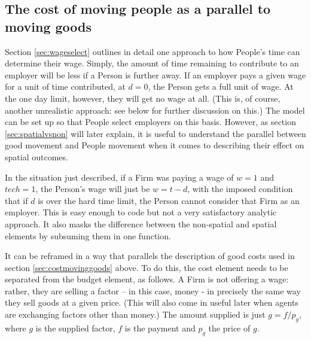 \subsection{The cost of moving people as a parallel to moving goods \label{sec:reframingpeoplecost}}

Section \ref{sec:wageselect} outlines in detail one approach to how People's time can determine their wage. Simply, the amount of time remaining to contribute to an employer will be less if a Person is further away. If an employer pays a given wage for a unit of time contributed, at $d=0$, the Person gets a full unit of wage. At the one day limit, however, they will get no wage at all. (This is, of course, another unrealistic approach: see below for further discussion on this.) The model can be set up so that People select employers on this basis. However, as section \ref{sec:spatialvsnon} will later explain, it is useful to understand the parallel between good movement and People movement when it comes to describing their effect on spatial outcomes. 

In the situation just described, if a Firm was paying a wage of $w=1$ and $tech=1$, the Person's wage will just be $w=t-d$, with the imposed condition that if $d$ is over the hard time limit, the Person cannot consider that Firm as an employer. This is easy enough to code but not a very satisfactory analytic approach. It also masks the difference between the non-spatial and spatial elements by subsuming them in one function.

It can be reframed in a way that parallels the description of good costs used in section \ref{sec:costmovinggoods} above. To do this, the cost element needs to be separated from the budget element, as follows. A Firm is not offering a wage: rather, they are selling a factor – in this case, money - in precisely the same way they sell goods at a given price. (This will also come in useful later when agents are exchanging factors other than money.) The amount supplied is just $g=f/p_g$, where $g$ is the supplied factor, $f$ is the payment and $p_g$ the price of $g$. 

